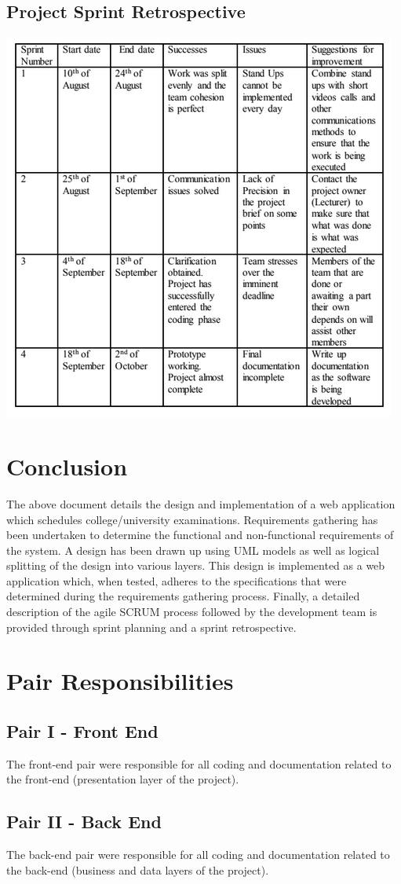 \documentclass{article}
\begin{document}
\subsection{Project Sprint Retrospective}

\centerline{\includegraphics[scale=0.9]{SprintRetrospective}}

\section{Conclusion}
The above document details the design and implementation of a web application which schedules college/university examinations. Requirements gathering has been undertaken to determine the functional and non-functional requirements of the system. A design has been drawn up using UML models as well as logical splitting of the design into various layers. This design is implemented as a web application which, when tested, adheres to the specifications that were determined during the requirements gathering process. Finally, a detailed description of the agile SCRUM process followed by the development team is provided through sprint planning and a sprint retrospective.

\appendix
\section{Pair Responsibilities}

\subsection{Pair I - Front End}
The front-end pair were responsible for all coding and documentation related to the front-end (presentation layer of the project).

\subsection{Pair II - Back End}
The back-end pair were responsible for all coding and documentation related to the back-end (business and data layers of the project).
\end{document}
